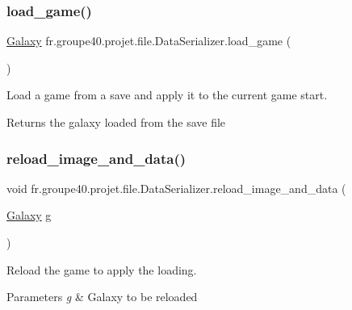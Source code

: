 \subsubsection{\texorpdfstring{load\+\_\+game()}{load\_game()}}
{\footnotesize\ttfamily \hyperlink{classfr_1_1groupe40_1_1projet_1_1model_1_1board_1_1_galaxy}{Galaxy} fr.\+groupe40.\+projet.\+file.\+Data\+Serializer.\+load\+\_\+game (\begin{DoxyParamCaption}{ }\end{DoxyParamCaption})}



Load a game from a save and apply it to the current game start. 

\begin{DoxyReturn}{Returns}
the galaxy loaded from the save file 
\end{DoxyReturn}
\mbox{\label{classfr_1_1groupe40_1_1projet_1_1file_1_1_data_serializer_a777ad420962d628b445d6012a5cfffb2}} 
\subsubsection{\texorpdfstring{reload\+\_\+image\+\_\+and\+\_\+data()}{reload\_image\_and\_data()}}
{\footnotesize\ttfamily void fr.\+groupe40.\+projet.\+file.\+Data\+Serializer.\+reload\+\_\+image\+\_\+and\+\_\+data (\begin{DoxyParamCaption}\item[{\hyperlink{classfr_1_1groupe40_1_1projet_1_1model_1_1board_1_1_galaxy}{Galaxy}}]{g }\end{DoxyParamCaption})}



Reload the game to apply the loading. 


\begin{DoxyParams}{Parameters}
{\em g} & Galaxy to be reloaded \\
\hline
\end{DoxyParams}
\mbox{\label{classfr_1_1groupe40_1_1projet_1_1file_1_1_data_serializer_a007629e3f94601342175120cd37b9f2a}} 
